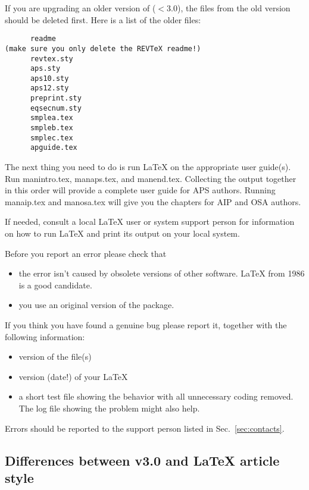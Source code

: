 If you are upgrading an older version of \REVTeX{} ($<$3.0), the files from
the old version should be deleted first. Here is a list of the older files:

\begin{verbatim}
      readme
(make sure you only delete the REVTeX readme!)
      revtex.sty
      aps.sty
      aps10.sty
      aps12.sty
      preprint.sty
      eqsecnum.sty
      smplea.tex
      smpleb.tex
      smplec.tex
      apguide.tex
\end{verbatim}

The next thing you need to do is run \LaTeX{} on the appropriate user
guide(s). Run manintro.tex, manaps.tex, and manend.tex. Collecting the
output together in this order will provide a complete user guide for APS
authors. Running manaip.tex and manosa.tex will give you the chapters for
AIP and OSA authors.

If needed, consult a local \LaTeX{} user or system support person for
information on how to run \LaTeX{} and print its output on your local
system.



Before you report an error please check that
\begin{itemize}
  \item the error isn't caused by obsolete versions of other software.
    \LaTeX{} from 1986 is a good candidate.

  \item you use an original version of the package.
\end{itemize}


If you think you have found a genuine bug please report it, together
with the following information:
\begin{itemize}
  \item version of the \REVTeX{} file(s)

  \item version (date!) of your \LaTeX{}

  \item a short test file showing the behavior with all unnecessary
    coding removed. The log file showing the problem might also help.
\end{itemize}


Errors should be reported to the support person listed in
Sec.\ \ref{sec:contacts}.






\subsection[Differences between \REVTeX{} v3.0 and \LaTeX{} article style]%
{Differences between \REVTeX{} v3.0 and LaTeX{} article style}
\label{sec:ltor}

